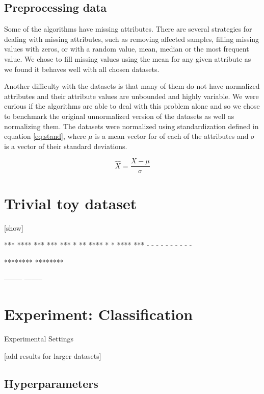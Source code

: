 \documentclass[12pt,a4paper]{report}
\begin{document}
\subsection{Preprocessing data}
Some of the algorithms have missing attributes. There are several strategies for dealing with missing attributes, such as removing affected samples, filling missing values with zeros, or with a random value, mean, median or the most frequent value. We chose to fill missing values using the mean for any given attribute as we found it behaves well with all chosen datasets.

Another difficulty with the datasets is that many of them do not have normalized attributes and their attribute values are unbounded and highly variable. We were curious if the algorithms are able to deal with this problem alone and so we chose to benchmark the original unnormalized version of the datasets as well as  normalizing them. The datasets were normalized using standardization defined in equation \ref{eq:stand}, where $\mu$ is a mean vector for of each of the attributes and $\sigma$ is a vector of their standard deviations.

\begin{equation} \label{eq:stand}
\hat{X} = \frac{X-\mu}{\sigma}
\end{equation}

\section{Trivial toy dataset} \label{chap:trivial-dataset}

[show]

	*** **** *** *** *** * ** **** * * **** ***
	-  -   -    -    -   -   -    -    -     -


	********
	********

	--------
	--------

\section{Experiment: Classification} \label{chap:experiment-knn}

Experimental Settings







[add results for larger datasets]




\subsection{Hyperparameters}
\end{document}
